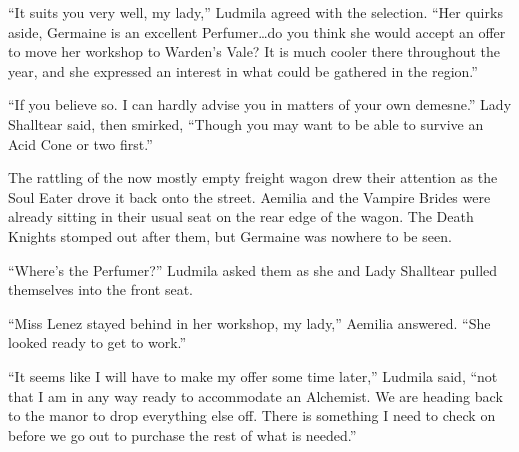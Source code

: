  

“It suits you very well, my lady,” Ludmila agreed with the selection. “Her quirks aside, Germaine is an excellent Perfumer…do you think she would accept an offer to move her workshop to Warden’s Vale? It is much cooler there throughout the year, and she expressed an interest in what could be gathered in the region.”

 

“If you believe so. I can hardly advise you in matters of your own demesne.” Lady Shalltear said, then smirked, “Though you may want to be able to survive an Acid Cone or two first.”

 

The rattling of the now mostly empty freight wagon drew their attention as the Soul Eater drove it back onto the street. Aemilia and the Vampire Brides were already sitting in their usual seat on the rear edge of the wagon. The Death Knights stomped out after them, but Germaine was nowhere to be seen.

 

“Where’s the Perfumer?” Ludmila asked them as she and Lady Shalltear pulled themselves into the front seat.

 

“Miss Lenez stayed behind in her workshop, my lady,” Aemilia answered. “She looked ready to get to work.”

 

“It seems like I will have to make my offer some time later,” Ludmila said, “not that I am in any way ready to accommodate an Alchemist. We are heading back to the manor to drop everything else off. There is something I need to check on before we go out to purchase the rest of what is needed.”